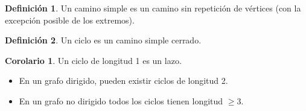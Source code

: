 \documentclass[10pt]{article}
\theoremstyle{definition}
\newtheorem{definition}{Definición}[section]
\newtheorem{corollary}{Corolario}[theorem]
\begin{document}
    \begin{definition}
        Un camino simple es un camino sin repetición de vértices (con la excepción posible de los extremos).
    \end{definition}
    \begin{definition}
        Un ciclo es un camino simple cerrado.
    \end{definition}
    \begin{corollary}
        Un ciclo de longitud 1 es un lazo.
        \begin{itemize}
            \item En un grafo dirigido, pueden existir ciclos de longitud 2.
            \item En un grafo no dirigido todos los ciclos tienen longitud $\ge 3$.
        \end{itemize}
    \end{corollary}
\end{document}
